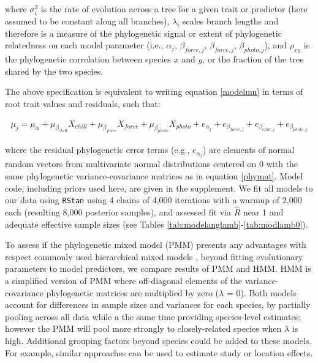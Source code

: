 \documentclass[11pt]{article}
\begin{document}
\noindent where $\sigma_i^2$ is the rate of evolution across a tree for a given trait or predictor (here assumed to be constant along all branches), $\lambda_i$ scales branch lengths and therefore is a measure of the phylogenetic signal or extent of phylogenetic relatedness on each model parameter (i.e., $\alpha_{j}$, $\beta_{force,j}$, $\beta_{force,j}$, $\beta_{photo,j}$), and $\rho_{xy}$ is the phylogenetic correlation between species $x$ and $y$, or the fraction of the tree shared by the two species.

The above specification is equivalent to writing equation \ref{modelmu} in terms of root trait values and residuals, such that:

\begin{align}
  \label{eqfive}
  \mu_j = \mu_\alpha + \mu_{\beta_{chill}} X_{chill} + \mu_{\beta_{force}} X_{force} + \mu_{\beta_{photo}} X_{photo} + e_{\alpha_{j}} + e_{\beta_{force,j}} + e_{\beta_{chill,j}} + e_{\beta_{photo,j}}
\end{align}

\noindent where the residual phylogenetic error terms (e.g., $e_{\alpha_{j}}$) are elements of normal random vectors from multivariate normal distributions centered on $0$ with the same phylogenetic variance-covariance matrices as in equation \ref{phymat}. Model code, including priors used here, are given in the supplement. We fit all models to our data using \verb|RStan| using 4 chains of 4,000 iterations with a warmup of 2,000 each (resulting 8,000 posterior samples), and assessed fit via $\hat{R}$ near 1 and adequate effective sample sizes (see Tables \ref{tab:modelanglamb}-\ref{tab:modlamb0}). 

To assess if the phylogenetic mixed model (PMM) presents any advantages with respect commonly used hierarchical mixed models \citep[HMM; see e.g., ][]{ettinger2020}, beyond fitting evolutionary parameters to model predictors, we compare results of PMM and HMM. HMM is a simplified version of PMM where off-diagonal elements of the variance-covariance phylogenetic matrices are multiplied by zero ($\lambda$ = 0). Both models account for differences in sample sizes and variances for each species, by partially pooling across all data while a the same time providing species-level estimates; however the PMM will pool more strongly to closely-related species when $\lambda$ is high. Additional grouping factors beyond species could be added to these models. For example, similar approaches can be used to estimate study or location effects.
\end{document}

